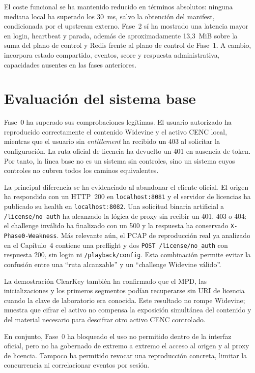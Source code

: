 El coste funcional se ha mantenido reducido en términos absolutos: ninguna mediana local ha superado los 30~ms, salvo la obtención del manifest, condicionada por el upstream externo. Fase~2 sí ha mostrado una latencia mayor en login, heartbeat y parada, además de aproximadamente 13,3~MiB sobre la suma del plano de control y Redis frente al plano de control de Fase~1. A cambio, incorpora estado compartido, eventos, score y respuesta administrativa, capacidades ausentes en las fases anteriores.

\section{Evaluación del sistema base}

Fase~0 ha superado sus comprobaciones legítimas. El usuario autorizado ha reproducido correctamente el contenido Widevine y el activo CENC local, mientras que el usuario sin \textit{entitlement} ha recibido un 403 al solicitar la configuración. La ruta oficial de licencia ha devuelto un 401 en ausencia de token. Por tanto, la línea base no es un sistema sin controles, sino un sistema cuyos controles no cubren todos los caminos equivalentes.

La principal diferencia se ha evidenciado al abandonar el cliente oficial. El origen ha respondido con un HTTP~200 en \nolinkurl{localhost:8081} y el servidor de licencias ha publicado su health en \nolinkurl{localhost:8082}. Una solicitud binaria artificial a \nolinkurl{/license/no_auth} ha alcanzado la lógica de proxy sin recibir un 401, 403 o 404; el challenge inválido ha finalizado con un 500 y la respuesta ha conservado \nolinkurl{X-Phase0-Weakness}. Más relevante aún, el PCAP de reproducción real ya analizado en el Capítulo~4 contiene una preflight y dos \nolinkurl{POST /license/no_auth} con respuesta 200, sin login ni \nolinkurl{/playback/config}. Esta combinación permite evitar la confusión entre una ``ruta alcanzable'' y un ``challenge Widevine válido''.

La demostración ClearKey también ha confirmado que el MPD, las inicializaciones y los primeros segmentos podían recuperarse sin URI de licencia cuando la clave de laboratorio era conocida. Este resultado no rompe Widevine; muestra que cifrar el activo no compensa la exposición simultánea del contenido y del material necesario para descifrar otro activo CENC controlado.

En conjunto, Fase~0 ha bloqueado el uso no permitido dentro de la interfaz oficial, pero no ha gobernado de extremo a extremo el acceso al origen y al proxy de licencia. Tampoco ha permitido revocar una reproducción concreta, limitar la concurrencia ni correlacionar eventos por sesión.

